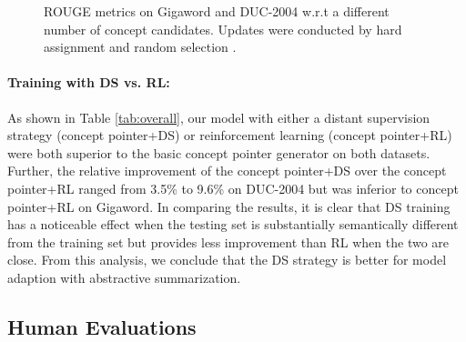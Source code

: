 \documentclass[11pt,a4paper]{article}
\begin{document}
\begin{figure}[t]
    \centering
    \caption{ROUGE metrics on Gigaword and DUC-2004 w.r.t a different number of concept candidates. Updates were conducted by hard assignment  and random selection . }
    \label{fig:conceptnumber}
\end{figure}
 
\paragraph{Training with DS vs. RL:}
As shown in Table \ref{tab:overall}, our model with either a distant supervision strategy (concept pointer+DS) or reinforcement learning (concept pointer+RL) were both superior to the basic concept pointer generator on both datasets. Further, the relative improvement of the concept pointer+DS over the concept pointer+RL ranged from 3.5\% to 9.6\% on DUC-2004 but was inferior to concept pointer+RL on Gigaword. In comparing the results, it is clear that DS training has a noticeable effect when the testing set is substantially semantically different from the training set but provides less improvement than RL when the two are close. From this analysis, we conclude that the DS strategy is better for model adaption with abstractive summarization.
 
 
\subsection{Human Evaluations}
\end{document}
